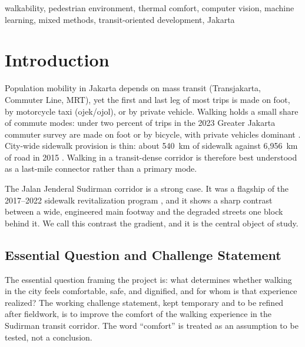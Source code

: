 \documentclass[conference]{IEEEtran}
\begin{document}
\begin{IEEEkeywords}
walkability, pedestrian environment, thermal comfort, computer vision, machine learning,
mixed methods, transit-oriented development, Jakarta
\end{IEEEkeywords}

\section{Introduction}
Population mobility in Jakarta depends on mass transit (Transjakarta, Commuter Line, MRT), yet
the first and last leg of most trips is made on foot, by motorcycle taxi (ojek/ojol), or by
private vehicle. Walking holds a small share of commute modes: under two percent of trips in the
2023 Greater Jakarta commuter survey are made on foot or by bicycle, with private vehicles
dominant \autocite{goodstats2024}. City-wide sidewalk provision is thin: about 540~km of sidewalk
against 6{,}956~km of road in 2015 \autocite{itdp2019}. Walking in a transit-dense corridor is
therefore best understood as a last-mile connector rather than a primary mode.

The Jalan Jenderal Sudirman corridor is a strong case. It was a flagship of the 2017--2022
sidewalk revitalization program \autocite{beritajakarta2019,itdp2019}, and it shows a sharp
contrast between a wide, engineered main footway and the degraded streets one block behind it. We
call this contrast the gradient, and it is the central object of study.

\subsection{Essential Question and Challenge Statement}
The essential question framing the project is: what determines whether walking in the city feels
comfortable, safe, and dignified, and for whom is that experience realized? The working challenge
statement, kept temporary and to be refined after fieldwork, is to improve the comfort of the
walking experience in the Sudirman transit corridor. The word ``comfort'' is treated as an
assumption to be tested, not a conclusion.
\end{document}
